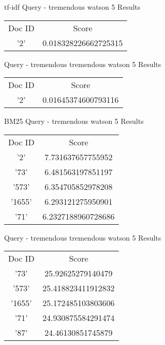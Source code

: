 \documentclass[12pt, letterpaper]{article}
\begin{document}
\begin{center}
tf-idf\newline
Query -  tremendous watson 5\newline
Results\newline\newline
\begin{tabular}{c|c}
	Doc ID & Score \\
	'2'& 0.018328226662725315 \\
\end{tabular}

Query -  tremendous tremendous watson 5\newline
Results	\newline\newline
\begin{tabular}{c|c}
	Doc ID & Score \\
	'2'& 0.01645374600793116 \\
\end{tabular}

BM25 \newline
Query -  tremendous watson 5\newline
Results 	\newline\newline
\begin{tabular}{c|c}
	Doc ID & Score \\
	'2'& 7.731637657755952 \\
	'73'& 6.481563197851197 \\
	'573'& 6.354705852978208 \\
	'1655'& 6.293121275950901 \\
	'71'& 6.2327188960728686 \\
\end{tabular}

Query -  tremendous tremendous watson 5\newline
Results\newline\newline
\begin{tabular}{c|c}
	Doc ID & Score \\
	'73'& 25.92625279140479 \\
	'573'& 25.418823411912832 \\
	'1655'& 25.172485103803606 \\
	'71'& 24.930875584291474 \\
	'87'& 24.46130851745879 \\
\end{tabular}
\end{center}
\end{document}
